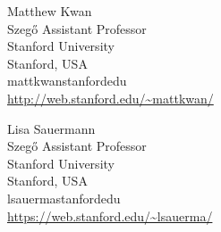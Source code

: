 \documentclass{daj}
\theoremstyle{plain}
\theoremstyle{plain}
\theoremstyle{plain}
\theoremstyle{plain}
\theoremstyle{definition}
\theoremstyle{plain}
\theoremstyle{plain}
\theoremstyle{definition}
\theoremstyle{definition}
\theoremstyle{plain}
\begin{document}
\begin{dajauthors}
\begin{authorinfo}[mkwa]
  Matthew Kwan\\
  Szeg\H o Assistant Professor\\
  Stanford University\\
  Stanford, USA\\
  mattkwan\imageat{}stanford\imagedot{}edu \\
  \url{http://web.stanford.edu/~mattkwan/}
\end{authorinfo}
\begin{authorinfo}[lsau]
  Lisa Sauermann\\
  Szeg\H o Assistant Professor\\
  Stanford University\\
  Stanford, USA\\
  lsauerma\imageat{}stanford\imagedot{}edu \\
  \url{https://web.stanford.edu/~lsauerma/}
\end{authorinfo}
\end{dajauthors}
\end{document}
